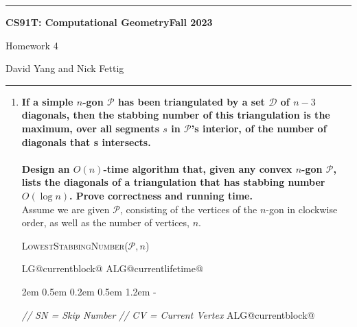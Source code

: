 \documentclass[11pt]{article}
\makeatletter
\newcommand{\codecomt}[1]{\color{blue}\textit{// #1}\color{black}}
\newlength{\continueindent}
\renewenvironment{algorithmic}[1][0]%
   {%
   \edef\ALG@numberfreq{#1}%
   \def\@currentlabel{\theALG@line}%
   \setcounter{ALG@line}{0}%
   \setcounter{ALG@rem}{0}%
   \let\\\algbreak%
   \expandafter\edef\csname ALG@currentblock@\theALG@nested\endcsname{0}%
   \expandafter\let\csname ALG@currentlifetime@\theALG@nested\endcsname\relax%
   \begin{list}%
      {\ALG@step}%
      {%
      \rightmargin\z@%
      \itemsep\z@ \itemindent\z@ \listparindent2em%
      \partopsep\z@ \parskip\z@ \parsep\z@%
      \labelsep 0.5em \topsep 0.2em%
      \ifthenelse{\equal{#1}{0}}%
         {\labelwidth 0.5em}%
         {\labelwidth 1.2em}%
       \leftmargin\labelwidth \addtolength{\leftmargin}{\labelsep}
      \ALG@tlm\z@%
      }%
      \parshape 2 \leftmargin \linewidth \continueindent \dimexpr\linewidth-\continueindent\relax
   \setcounter{ALG@nested}{0}%
   \ALG@beginalgorithmic%
   }%
   {%
   \ALG@closeloops%
   \expandafter\ifnum\csname ALG@currentblock@\theALG@nested\endcsname=0\relax%
   \else%
      \PackageError{algorithmicx}{Some blocks are not closed!!!}{}%
   \fi%
   \ALG@endalgorithmic%
   \end{list}%
   }%
\makeatother
\begin{document}
\hrule
\begin{center}
    \textbf{CS91T: Computational Geometry}\hfill \textbf{Fall 2023}\newline

    {\Large Homework 4}

    David Yang and Nick Fettig
\end{center}

\hrule

\vspace{1em}


\begin{enumerate}
    \item \textbf{If a simple $n$-gon $\mathcal{P}$ has been triangulated by a set $\mathcal{D}$ of $n - 3$ diagonals, then the stabbing number of this triangulation is the maximum, over all segments $s$ in $\mathcal{P}$’s interior, of the number of diagonals that s intersects. \\ \\ Design an $O(n)$-time algorithm that, given any convex $n$-gon $\mathcal{P}$, lists the diagonals of a triangulation that has stabbing number $O(\log n)$. Prove correctness and running time.} \\

    Assume we are given $\mathcal{P}$, consisting of the vertices of the $n$-gon in clockwise order, as well as the number of vertices, $n$. 
    
    \begin{minipage}[t]{0.9\textwidth}
    \begin{algorithm}[H]
    \caption{\textsc{LowestStabbingNumber}($\mathcal{P}, n$)}
    \begin{algorithmic}[1]
         \hfill\codecomt{SN = Skip Number}
         \hfill\codecomt{CV = Current Vertex}
            \EndIf
        \EndFor
    \end{algorithmic}
    \end{algorithm}
    \end{minipage}

    \vspace{1cm}


\end{enumerate}
\end{document}
